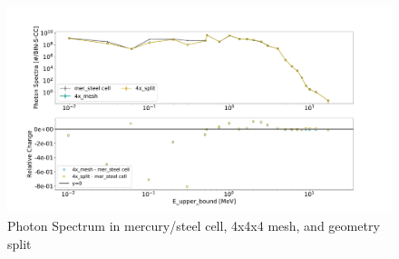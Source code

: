 %
\begin{figure}[h!]
 \centering
 \includegraphics[scale=0.42,trim={2cm 0.5cm 3cm 2cm},clip]{../figs/toy_p2/spec_VPII_4x.pdf}
 \caption{Photon Spectrum in mercury/steel cell, 4x4x4 mesh, and geometry split}
 \label{fig:2spec_cell_4x}
\end{figure}
%


